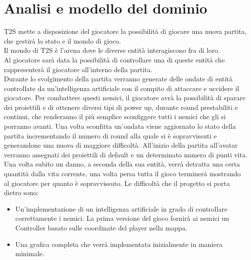 \documentclass[a4paper,12pt]{report}
\begin{document}
\section{Analisi e modello del dominio}
T2S mette a disposizione del giocatore la possibilità di giocare una nuova partita, che gestirà lo stato e il mondo di gioco.
\\
Il mondo di T2S è l’arena dove le diverse entità interagiscono fra di loro.
\\
Al giocatore sarà data la possibilità di controllare una di queste entità che rappresenterà il giocatore all’interno della partita.
\\
Durante lo svolgimento della partita verranno generate delle ondate di entità controllate da un’intelligenza artificiale con il compito di attaccare e uccidere il giocatore.
Per combattere questi nemici, il giocatore avrà la possibilità di sparare dei proiettili e di ottenere diversi tipi di power up, durante round prestabiliti e continui, 
che renderanno il più semplice sconfiggere tutti i nemici che gli si porranno avanti.
Una volta sconfitta un’ondata viene aggiornato lo stato della partita incrementando il numero di round alla quale si è sopravvissuti 
e generandone una nuova di maggiore difficoltà.
All’inizio della partita all’avatar verranno assegnati dei proiettili di default e un determinato numero di punti vita.
Una volta subito un danno, a seconda della sua entità, verrà detratta una certa quantità dalla vita corrente, una volta persa tutta il gioco terminerà mostrando 
al giocatore per quanto è sopravvissuto.
Le difficoltà che il progetto si porta dietro sono:
\begin{itemize}
	\item Un’implementazione di un intelligenza artificiale in grado di controllare correttamente i nemici.
	La prima versione del gioco fornirà ai nemici un Controller basato sulle coordinate del player nella mappa.
	\item Una grafica completa che verrà implementata inizialmente in maniera minimale.
\end{itemize}
\end{document}
